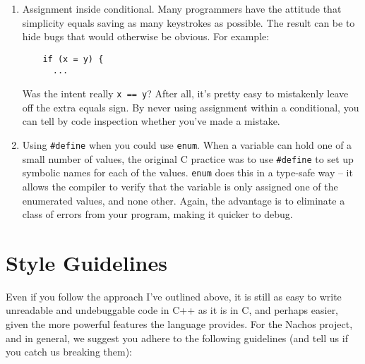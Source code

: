 \begin{enumerate}
\item Assignment inside conditional.  Many programmers have the attitude
that simplicity equals saving as many keystrokes as possible.
The result can be to hide bugs that would otherwise be obvious.
For example:

\begin{verbatim}
    if (x = y) {
      ...
\end{verbatim}

Was the intent really {\tt x == y}?  After all, it's pretty easy
to mistakenly leave off the extra equals sign.  By never using
assignment within a conditional, you can tell by code inspection
whether you've made a mistake.

\item Using {\tt \#define} when you could use {\tt enum}.
When a variable can hold one of a small number of values,
the original C practice was to use {\tt \#define} to set up
symbolic names for each of the values.  {\tt enum} does this
in a type-safe way -- it allows the compiler to verify
that the variable is only assigned one of the enumerated values,
and none other.  Again, the advantage is to eliminate a class of
errors from your program, making it quicker to debug.
\end{enumerate}
\newpage

\section{Style Guidelines}

Even if you follow the approach I've outlined above, it is still
as easy to write unreadable and undebuggable code in C++ as it
is in C, and perhaps easier, given the more powerful features the
language provides.  For the Nachos project, and in general, we suggest
you adhere to the following guidelines (and tell us if you catch us
breaking them):

